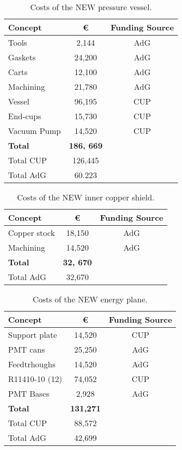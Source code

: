 \begin{table}[h!]
\begin{center}
\begin{tabular}{|l|c|c|}
\hline
 Concept & \euro & Funding Source \\
 \hline
 Tools &	2,144 &	AdG \\
Gaskets & 24,200 &	AdG \\
Carts	& 12,100 &	AdG\\
Machining	 & 21,780 & 	AdG\\
Vessel	& 96,195 &	CUP \\
End-cups	& 15,730 &	CUP \\
Vacuum Pump	& 14,520 & CUP \\
 \hline
{\bf Total}	& {\bf186, 669 }& \\	
Total CUP	& 126,445 & \\	
Total AdG	& 60.223 & \\	
 \hline\hline
\end{tabular}  
\caption{Costs of the NEW pressure vessel.}
\label{tab.new:PV}
\end{center}
\end{table} 

\begin{table}[h!]
\begin{center}
\begin{tabular}{|l|c|c|}
\hline
 Concept & \euro & Funding Source \\
 \hline
 Copper stock &	18,150 &	AdG \\
Machining & 14,520 &	AdG \\
 \hline
{\bf Total} &	{\bf 32, 670} & \\		
Total AdG	& 32,670 & \\	
 \hline\hline
\end{tabular}  
\caption{Costs of the NEW inner copper shield.}
\label{tab.new:ICS}
\end{center}
\end{table} 

\begin{table}[h!]
\begin{center}
\begin{tabular}{|l|c|c|}
\hline
 Concept & \euro & Funding Source \\
 \hline
Support plate	&	14,520 &	CUP \\
PMT cans &	25,250 &	AdG\\
Feedtrhoughs &	14,520 &	AdG \\
R11410-10 (12) &	74,052 &	CUP \\
PMT Bases &		2,928 &	AdG\\
  \hline
{\bf Total}	&	{\bf 131,271}	& \\
Total CUP	&	88,572	&\\
Total AdG	&	42,699 & \\	
 \hline\hline
\end{tabular}  
\caption{Costs of the NEW energy plane.}
\label{tab.new:EP}
\end{center}
\end{table}

